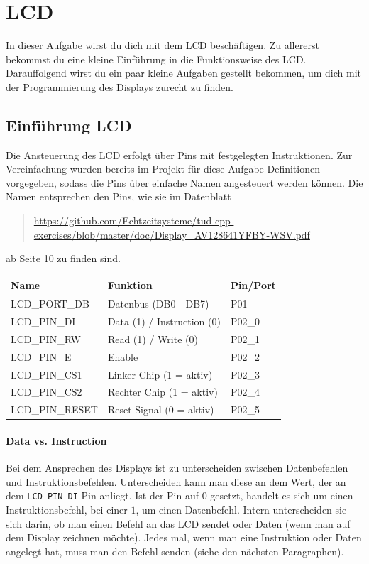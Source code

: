 \section{LCD}
In dieser Aufgabe wirst du dich mit dem LCD beschäftigen.
Zu allererst bekommst du eine kleine Einführung in die Funktionsweise des LCD.
Darauffolgend wirst du ein paar kleine Aufgaben gestellt bekommen, um dich mit der Programmierung des Displays zurecht zu finden.

\subsection*{Einführung LCD}
Die Ansteuerung des LCD erfolgt über Pins mit festgelegten Instruktionen.
Zur Vereinfachung wurden bereits im Projekt für diese Aufgabe Definitionen vorgegeben, sodass die Pins über einfache Namen angesteuert werden können. Die Namen entsprechen den Pins, wie sie im Datenblatt
\begin{quote}
	\url{https://github.com/Echtzeitsysteme/tud-cpp-exercises/blob/master/doc/Display_AV128641YFBY-WSV.pdf}
\end{quote}
ab Seite 10 zu finden sind.

\begin{center}
	\begin{tabular}{l|l|l}
		\toprule
		\textbf{Name} & \textbf{Funktion} & \textbf{Pin/Port} \\ 
		\midrule
		LCD\_PORT\_DB & Datenbus (DB0 - DB7) & P01 \\ 
		LCD\_PIN\_DI & Data (1) / Instruction (0) & P02\_0 \\ 
		LCD\_PIN\_RW & Read (1) / Write (0) & P02\_1 \\ 
		LCD\_PIN\_E & Enable & P02\_2 \\ 
		LCD\_PIN\_CS1 & Linker Chip (1 = aktiv) & P02\_3 \\ 
		LCD\_PIN\_CS2 & Rechter Chip (1 = aktiv) & P02\_4 \\ 
		LCD\_PIN\_RESET & Reset-Signal (0 = aktiv) & P02\_5 \\ 
		\bottomrule
	\end{tabular}
\end{center}

\paragraph{Data vs. Instruction}
Bei dem Ansprechen des Displays ist zu unterscheiden zwischen Datenbefehlen und Instruktionsbefehlen.
Unterscheiden kann man diese an dem Wert, der an dem \lstinline{LCD_PIN_DI} Pin anliegt.
Ist der Pin auf $0$ gesetzt, handelt es sich um einen Instruktionsbefehl, bei einer $1$, um einen Datenbefehl.
Intern unterscheiden sie sich darin, ob man einen Befehl an das LCD sendet oder Daten (wenn man auf dem Display zeichnen möchte).
Jedes mal, wenn man eine Instruktion oder Daten angelegt hat, muss man den Befehl senden (siehe den nächsten Paragraphen).

